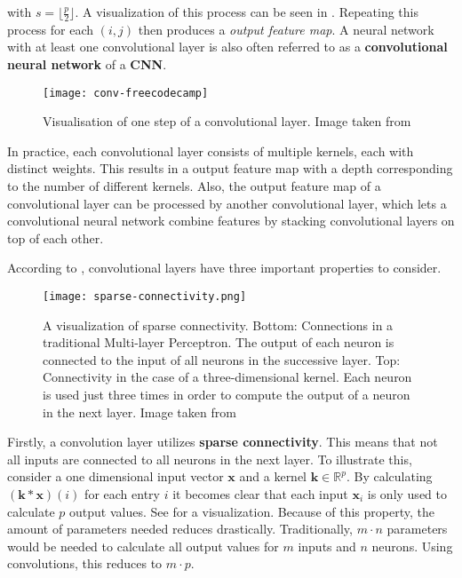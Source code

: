 with $s = \lfloor \frac{p}{2} \rfloor$.
A visualization of this process can be seen in .
Repeating this process for each $(i,j)$ then produces a \textit{output feature map}.
A neural network with at least one convolutional layer is also often referred to as a \textbf{convolutional neural network} of a \textbf{CNN}.

\begin{figure}[htb!]
    \centering
    \texttt{[image: conv-freecodecamp]}
    \caption{Visualisation of one step of a convolutional layer. Image taken from \cite{dertat_applied_2017}}
    \label{fig:conv-vis}
\end{figure}

In practice, each convolutional layer consists of multiple kernels, each with distinct weights.
This results in a output feature map with a depth corresponding to the number of different kernels.
Also, the output feature map of a convolutional layer can be processed by another convolutional layer, which lets a convolutional neural network combine features by stacking convolutional layers on top of each other.

According to \cite{goodfellow_deep_2016}, convolutional layers have three important properties to consider.

\begin{figure}[htb!]
    \centering
    \texttt{[image: sparse-connectivity.png]}
    \caption{A visualization of sparse connectivity. Bottom: Connections in a traditional Multi-layer Perceptron. The output of each neuron is connected to the input of all neurons in the successive layer. Top: Connectivity in the case of a three-dimensional kernel. Each neuron is used just three times in order to compute the output of a neuron in the next layer. Image taken from \cite{goodfellow_deep_2016}}
    \label{fig:sparse-connectivity}
\end{figure}

Firstly, a convolution layer utilizes \textbf{sparse connectivity}.
This means that not all inputs are connected to all neurons in the next layer.
To illustrate this, consider a one dimensional input vector $\bm{x}$ and a kernel $\bm{k} \in \mathbb{R}^p$.
By calculating $(\bm{k} * \bm{x})(i)$ for each entry $i$ it becomes clear that each input $\bm{x}_i$ is only used to calculate $p$ output values.
See  for a visualization.
Because of this property, the amount of parameters needed reduces drastically.
Traditionally, $m \cdot n$ parameters would be needed to calculate all output values for $m$ inputs and $n$ neurons.
Using convolutions, this reduces to $m \cdot p$.

